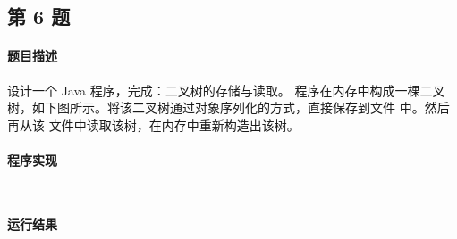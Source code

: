 \documentclass{academics}
\begin{document}
\subsection{第 6 题}

\paragraph{题目描述} {
    设计一个 Java 程序，完成：二叉树的存储与读取。
    程序在内存中构成一棵二叉树，如下图所示。将该二叉树通过对象序列化的方式，直接保存到文件  中。然后再从该  文件中读取该树，在内存中重新构造出该树。
    \begin{figure}[h]
        \centering
    \end{figure}
}

\paragraph{程序实现} {
    \inputminted[label=TreeNode.java]{java}{../src/P06/TreeNode.java}
    \inputminted[label=BinaryTreeSerialize.java]{java}{../src/P06/BinaryTreeSerialize.java}
}

\paragraph{运行结果} {
    \inputminted{text}{../res/P06.out}
}
\end{document}
